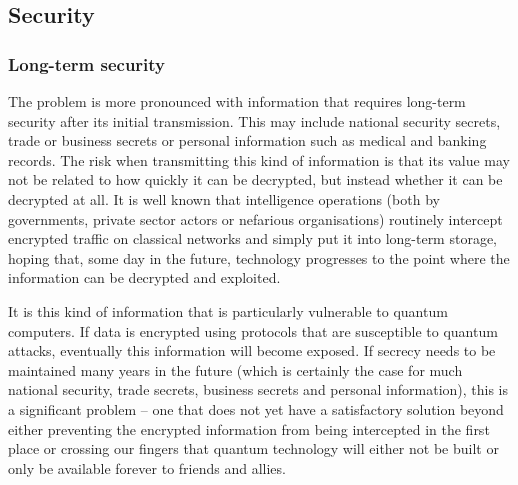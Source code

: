 \documentclass[twocolumn, aps, rmp, amsmath, amssymb, nofootinbib, superscriptaddress, longbibliography, floatfix, table-of-contents, eqsecnum]{revtex4-2}
\begin{document}


\subsection{Security}

\subsubsection{Long-term security}

The problem is more pronounced with information that requires long-term security after its initial transmission. This may include national security secrets, trade or business secrets or personal information such as medical and banking records. The risk when transmitting this kind of information is that its value may not be related to how quickly it can be decrypted, but instead whether it can be decrypted at all. It is well known that intelligence operations (both by governments, private sector actors or nefarious organisations) routinely intercept encrypted traffic on classical networks and simply put it into long-term storage, hoping that, some day in the future, technology progresses to the point where the information can be decrypted and exploited. 

It is this kind of information that is particularly vulnerable to quantum computers. If data is encrypted using protocols that are susceptible to quantum attacks, eventually this information will become exposed. If secrecy needs to be maintained many years in the future (which is certainly the case for much national security, trade secrets, business secrets and personal information), this is a significant problem -- one that does not yet have a satisfactory solution beyond either preventing the encrypted information from being intercepted in the first place or crossing our fingers that quantum technology will either not be built or only be available forever to friends and allies. 
\end{document}

